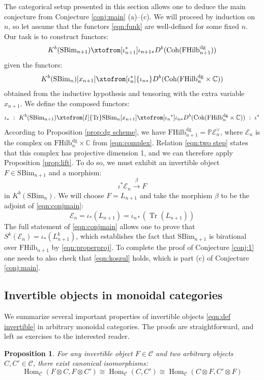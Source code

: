\documentclass[12pt]{amsart}
\numberwithin{equation}{section}
\newtheorem{proposition}[theorem]{Proposition}
\theoremstyle{definition}
\theoremstyle{remark}
\DeclareMathOperator{\Tr}{Tr}
\DeclareMathOperator{\Hom}{Hom}
\newcommand{\CC}{\mathbb{C}}
\newcommand{\PP}{\mathbb{P}}
\newcommand{\cat}{\mathcal{C}}
\newcommand{\CE}{\mathcal{E}}
\newcommand{\CT}{\mathcal{T}}
\renewcommand{\1}{\mathbf{1}}
\newcommand{\coh}{\mathrm{Coh}}
\newcommand{\FH}{\mathrm{FHilb}}
\newcommand{\SBim}{\mathrm{SBim}}
\newcommand{\dg}{\text{dg}}%
\begin{document}
The categorical setup presented in this section allows one to deduce the main conjecture from Conjecture \ref{conj:main} (a)--(c). We will proceed by induction on $n$, so let assume that the functors \eqref{eqn:funk} are well-defined for some fixed $n$. Our task is to construct functors:
$$
K^b(\SBim_{n+1}) \xtofrom[{\iota}_{n+1}^*]{\iota_{n+1*}}   D^b(\coh(\FH^\dg_{n+1}))
$$
given the functors:
$$
K^b(\SBim_{n})[x_{n+1}] \xtofrom[\iota_n^*]{\iota_{n*}} D^b(\coh(\FH^\dg_{n} \times \CC) )
$$
obtained from the inductive hypothesis and tensoring with the extra variable $x_{n+1}$. We define the composed functors:
$$
\iota_* \ : \ K^b(\SBim_{n+1}) \xtofrom[I]{\Tr}  \SBim_{n}[x_{n+1}] \xtofrom[{\iota_n}^*]{\iota_{n*}} D^b(\coh(\FH^\dg_{n} \times \CC)) \ : \ \iota^*
$$
According to Proposition \ref{prop:dg scheme}, we have $\FH^\dg_{n+1} = \PP \CE^{\vee}_n$, where $\CE_n$ is the complex on $\FH^\dg_n \times \CC$ from \eqref{eqn:complex}. Relation \eqref{eqn:two step} states that this complex has projective dimension 1, and we can therefore apply Proposition \ref{prop:lift}. To do so, we must exhibit an invertible object $F \in \SBim_{n+1}$ and a morphism:
$$
\iota^* \CE_n \stackrel{\beta}\longrightarrow F
$$
in $K^b(\SBim_n)$. We will choose $F = L_{n+1}$ and take the morphism $\beta$ to be the adjoint of \eqref{eqn:conjmain}:
$$
\CE_n = \iota_*(L_{n+1}) = \iota_{n*} \left( \Tr(L_{n+1}) \right)
$$
The full statement of \eqref{eqn:conjmain} allows one to prove that $S^k(\CE_n) = \iota_*(L_{n+1}^k)$, which establishes the fact that $\SBim_{n+1}$ is birational over $\FH_{n+1}$ by \eqref{eqn:properproj}. To complete the proof of Conjecture \ref{conj:1} one needs to also check that \eqref{eqn:koszul} holds, which is part (c) of Conjecture \ref{conj:main}.

\subsection{Invertible objects in monoidal categories}
\label{sub:invertible}

We summarize several important properties of invertible objects \eqref{eqn:def invertible} in arbitrary monoidal categories. The proofs are straightforward, and left as exercises to the interested reader.

\begin{proposition}
\label{prop:inv}
For any invertible object $F\in \cat$ and two arbitrary objects $C,C'\in \cat$, there exist canonical isomorphisms:
$$
\Hom_{\cat}(F \otimes C, F \otimes C') \cong \Hom_{\cat}(C,C') \cong \Hom_{\cat}(C \otimes F, C' \otimes F)
$$
\end{proposition}
\end{document}
